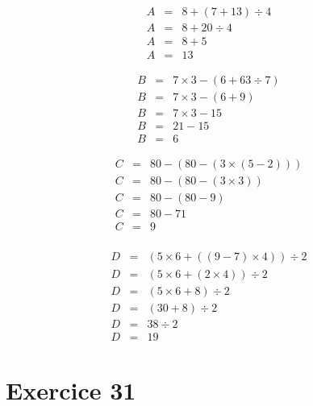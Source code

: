 \begin{multicols}{2}
	\begin{eqnarray*}
		A &=&  8 + (7 + 13) \div 4 \\
		A &=& 8 + 20 \div 4 \\
		A &=& 8 + 5 \\
		A &=& 13
	\end{eqnarray*}
	
	\begin{eqnarray*}
		B &=& 7 \times 3 - (6 + 63 \div 7) \\
		B &=& 7 \times 3 - (6 + 9)\\
		B &=& 7 \times 3 - 15 \\
		B &=& 21 - 15\\
		B &=& 6 
	\end{eqnarray*}
	
	\begin{eqnarray*}
		C &=& 80 - (80 - (3 \times (5 -2))) \\
		C &=& 80 - (80 - (3 \times 3)) \\
		C &=& 80 - (80 - 9) \\
		C &=& 80 - 71 \\
		C &=& 9 \\		
	\end{eqnarray*}
	
	\begin{eqnarray*}
		D &=&  (5 \times 6 + ((9 - 7) \times 4)) \div 2 \\
		D &=& (5 \times 6 + (2 \times 4)) \div 2 \\
		D &=& (5 \times 6 + 8) \div 2 \\
		D &=& (30 + 8) \div 2 \\
		D &=& 38 \div 2 \\
		D &=& 19
	\end{eqnarray*}
\end{multicols}


\section*{Exercice 31}
\vspace*{-1cm}

